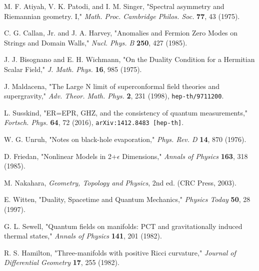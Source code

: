 \documentclass[11pt, letterpaper]{report}
\theoremstyle{plain} %
\theoremstyle{definition} %
\theoremstyle{remark} %
\begin{document}
\begin{thebibliography}{99} %

M. F. Atiyah, V. K. Patodi, and I. M. Singer, "Spectral asymmetry and Riemannian geometry. I," \textit{Math. Proc. Cambridge Philos. Soc.} \textbf{77}, 43 (1975).

C. G. Callan, Jr. and J. A. Harvey, "Anomalies and Fermion Zero Modes on Strings and Domain Walls," \textit{Nucl. Phys. B} \textbf{250}, 427 (1985).

J. J. Bisognano and E. H. Wichmann, "On the Duality Condition for a Hermitian Scalar Field," \textit{J. Math. Phys.} \textbf{16}, 985 (1975).

J. Maldacena, "The Large N limit of superconformal field theories and supergravity," \textit{Adv. Theor. Math. Phys.} \textbf{2}, 231 (1998), \texttt{hep-th/9711200}.

L. Susskind, "ER=EPR, GHZ, and the consistency of quantum measurements," \textit{Fortsch. Phys.} \textbf{64}, 72 (2016), \texttt{arXiv:1412.8483 [hep-th]}.

W. G. Unruh, "Notes on black-hole evaporation," \textit{Phys. Rev. D} \textbf{14}, 870 (1976).

D. Friedan, "Nonlinear Models in 2+$\epsilon$ Dimensions," \textit{Annals of Physics} \textbf{163}, 318 (1985).

M. Nakahara, \textit{Geometry, Topology and Physics}, 2nd ed. (CRC Press, 2003).

E. Witten, "Duality, Spacetime and Quantum Mechanics," \textit{Physics Today} \textbf{50}, 28 (1997).

G. L. Sewell, "Quantum fields on manifolds: PCT and gravitationally induced thermal states," \textit{Annals of Physics} \textbf{141}, 201 (1982).

R. S. Hamilton, "Three-manifolds with positive Ricci curvature," \textit{Journal of Differential Geometry} \textbf{17}, 255 (1982).


\end{thebibliography}
\end{document}
